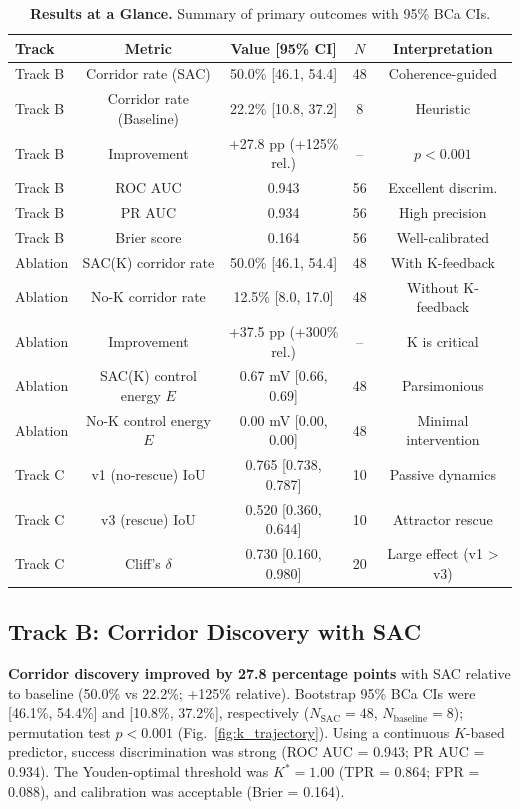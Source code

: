 \documentclass[10pt,letterpaper]{article}
\begin{document}
\begin{table}[h]
\caption{\textbf{Results at a Glance.} Summary of primary outcomes with 95\% BCa CIs.}
\begin{tabular}{lcccc}
\hline
\textbf{Track} & \textbf{Metric} & \textbf{Value [95\% CI]} & \textbf{$N$} & \textbf{Interpretation} \\
\hline
Track B & Corridor rate (SAC) & 50.0\% [46.1, 54.4] & 48 & Coherence-guided \\
Track B & Corridor rate (Baseline) & 22.2\% [10.8, 37.2] & 8 & Heuristic \\
Track B & Improvement & +27.8 pp (+125\% rel.) & -- & $p < 0.001$ \\
Track B & ROC AUC & 0.943 & 56 & Excellent discrim. \\
Track B & PR AUC & 0.934 & 56 & High precision \\
Track B & Brier score & 0.164 & 56 & Well-calibrated \\
Ablation & SAC(K) corridor rate & 50.0\% [46.1, 54.4] & 48 & With K-feedback \\
Ablation & No-K corridor rate & 12.5\% [8.0, 17.0] & 48 & Without K-feedback \\
Ablation & Improvement & +37.5 pp (+300\% rel.) & -- & K is critical \\
Ablation & SAC(K) control energy $E$ & 0.67 mV [0.66, 0.69] & 48 & Parsimonious \\
Ablation & No-K control energy $E$ & 0.00 mV [0.00, 0.00] & 48 & Minimal intervention \\
Track C & v1 (no-rescue) IoU & 0.765 [0.738, 0.787] & 10 & Passive dynamics \\
Track C & v3 (rescue) IoU & 0.520 [0.360, 0.644] & 10 & Attractor rescue \\
Track C & Cliff's $\delta$ & 0.730 [0.160, 0.980] & 20 & Large effect (v1 > v3) \\
\hline
\end{tabular}
\label{tab:results-summary}
\end{table}

\subsection*{Track B: Corridor Discovery with SAC}

\textbf{Corridor discovery improved by 27.8 percentage points} with SAC relative to baseline (50.0\% vs 22.2\%; +125\% relative). Bootstrap 95\% BCa CIs were [46.1\%, 54.4\%] and [10.8\%, 37.2\%], respectively ($N_{\text{SAC}} = 48$, $N_{\text{baseline}} = 8$); permutation test $p < 0.001$ (Fig.~\ref{fig:k_trajectory}). Using a continuous $K$-based predictor, success discrimination was strong (ROC AUC = 0.943; PR AUC = 0.934). The Youden-optimal threshold was $K^* = 1.00$ (TPR = 0.864; FPR = 0.088), and calibration was acceptable (Brier = 0.164).
\end{document}
